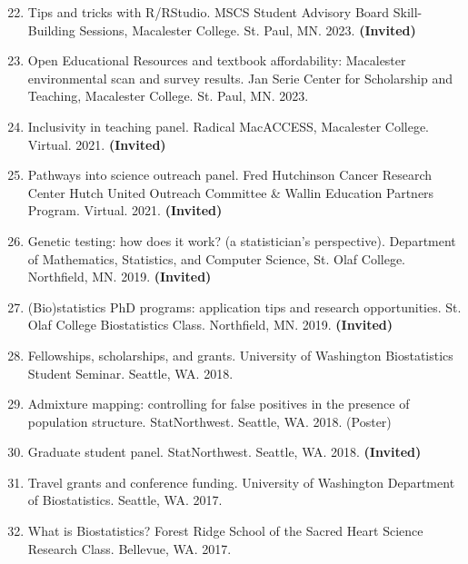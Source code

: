 \documentclass[margin]{res}
\newenvironment{benumerate}[1]{
    \let\oldItem\item
    \def\item{\addtocounter{enumi}{-2}\oldItem}
    
    \begin{enumerate}
    \setcounter{enumi}{#1}
    \addtocounter{enumi}{1}
}{
    \end{enumerate}
}
\begin{document}
\begin{resume}
\begin{benumerate}{21}
\item Tips and tricks with R/RStudio.  MSCS Student Advisory Board Skill-Building Sessions, Macalester College. St. Paul, MN. 2023. \textbf{(Invited)}

\item Open Educational Resources and textbook affordability: Macalester environmental scan and survey results.  Jan Serie Center for Scholarship and Teaching, Macalester College. St. Paul, MN. 2023.


\item Inclusivity in teaching panel. Radical MacACCESS, Macalester College. Virtual. 2021. \textbf{(Invited)}

\item Pathways into science outreach panel. Fred Hutchinson Cancer Research Center Hutch United Outreach Committee \& Wallin Education Partners Program. Virtual. 2021. \textbf{(Invited)}

\item Genetic testing: how does it work? (a statistician's perspective). Department of Mathematics, Statistics, and Computer Science, St. Olaf College. Northfield, MN. 2019. \textbf{(Invited)}

\item (Bio)statistics PhD programs: application tips and research opportunities. St. Olaf College Biostatistics Class. Northfield, MN. 2019. \textbf{(Invited)}

\item Fellowships, scholarships, and grants. University of Washington Biostatistics Student Seminar. Seattle, WA. 2018.

\item %
Admixture mapping: controlling for false positives in the presence of population structure. StatNorthwest. Seattle, WA. 2018. (Poster)

\item Graduate student panel. StatNorthwest. Seattle, WA. 2018. \textbf{(Invited)}

\item %
Travel grants and conference funding. University of Washington Department of Biostatistics. Seattle, WA. 2017.

\item %
What is Biostatistics? Forest Ridge School of the Sacred Heart Science Research Class. Bellevue, WA. 2017.


\end{benumerate}
\end{resume}
\end{document}
